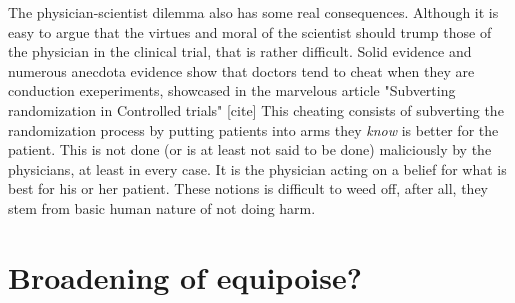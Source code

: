 \documentclass[12p]{article}
\begin{document}
The physician-scientist dilemma also has some real consequences.
Although it is easy to argue that the virtues and moral of the scientist should trump those of the physician in the clinical trial, that is rather difficult.
Solid evidence and numerous anecdota evidence show that doctors tend to cheat when they are conduction exeperiments, showcased in the marvelous article "Subverting randomization in Controlled trials" [cite]
This cheating consists of subverting the randomization process by putting patients into arms they \emph{know} is better for the patient.
This is not done (or is at least not said to be done) maliciously by the physicians, at least in every case.
It is the physician acting on a belief for what is best for his or her patient.
These notions is difficult to weed off, after all, they stem from basic human nature of not doing harm.

\section*{Broadening of equipoise?}


%
\end{document}
